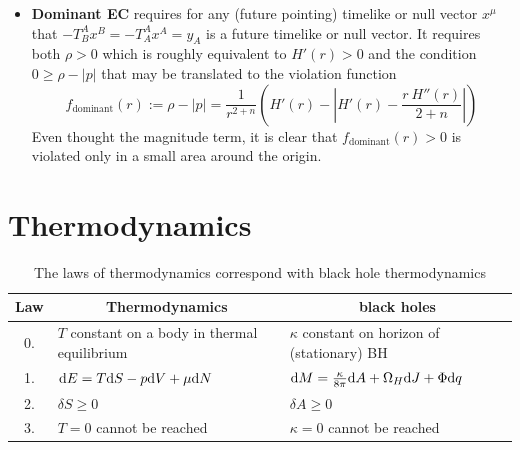 \documentclass[12pt,a4paper]{report}
\numberwithin{equation}{chapter}
\begin{document}
\begin{itemize}
\item {\bf Dominant EC} requires for any (future pointing) timelike or null vector $x^\mu$ that $-T^A_B x^B=-T^A_A x^A=y_A$ is a future timelike or null vector. It requires both $\rho>0$ which is roughly equivalent to $H'(r)>0$ and the condition $0 \geq \rho - |p|$ that may be translated to the violation function
\begin{equation}
f_\text{dominant}(r) := \rho - |p|
= \frac{1}{r^{2+n}}
\left( H'(r) -
\left|
H'(r) - \frac{r~H''(r)}{2+n}
\right|
\right)
\end{equation}
Even thought the magnitude term, it is clear that $f_\text{dominant}(r)>0$ is violated only in a small area around the origin.

\end{itemize}
%
%


\section{Thermodynamics}\label{sec:general-thermo}

\begin{table}[h!]
\begin{center}
\begin{tabular}[2pt]{cll}
\firsthline
    Law & \multicolumn{1}{c}{Thermodynamics} & \multicolumn{1}{c}{black holes} \\
    \midrule
0.  &  $T$ constant on a body in thermal equilibrium & $\kappa$ constant on horizon of (stationary) BH \\
1.  & $\mathrm{d} E = T\mathrm{d} S - p\mathrm{d} V + \mu \mathrm{d} N $ & $\mathrm{d} M = \frac{\kappa}{8\pi}  \mathrm{d} A + \Omega_H \mathrm{d} J + \Phi \mathrm{d} q$ \\
2.  & $\delta S \geq 0$ & $\delta A \geq 0$ \\
3.  & $T=0$ cannot be reached & $\kappa = 0$ cannot be reached \\
    \bottomrule
\end{tabular}
\end{center}
\caption{The laws of thermodynamics correspond with black hole thermodynamics}\label{table:thermodynamic-laws}
\end{table}
\end{document}
